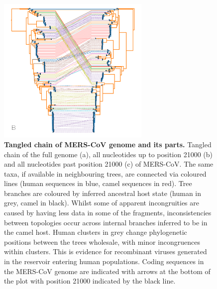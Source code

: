 \documentclass[11pt,oneside,letterpaper]{article}
\begin{document}
\begin{figure}[h]
 \centering
	\includegraphics[width=0.65\textwidth]{figures/mers_chain.png}
	\caption{\textbf{Tangled chain of MERS-CoV genome and its parts.}
	Tangled chain of the full genome (a), all nucleotides up to position 21000 (b) and all nucleotides past position 21000 (c) of MERS-CoV.
	The same taxa, if available in neighbouring trees, are connected via coloured lines (human sequences in blue, camel sequences in red).
	Tree branches are coloured by inferred ancestral host state (human in grey, camel in black).
	Whilst some of apparent incongruities are caused by having less data in some of the fragments, inconsistencies between topologies occur across internal branches inferred to be in the camel host.
	Human clusters in grey change phylogenetic positions between the trees wholesale, with minor incongruences within clusters.
	This is evidence for recombinant viruses generated in the reservoir entering human populations.
	Coding sequences in the MERS-CoV genome are indicated with arrows at the bottom of the plot with position 21000 indicated by the black line.
	}
	\label{fig:mers_chain}
\end{figure}

\end{document}
